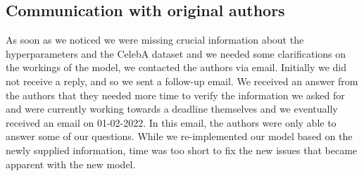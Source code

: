 \subsection{Communication with original authors}

As soon as we noticed we were missing crucial information about the hyperparameters and the CelebA dataset and we needed some clarifications on the workings of the model, we contacted the authors via email. Initially we did not receive a reply, and so we sent a follow-up email. We received an answer from the authors that they needed more time to verify the information we asked for and were currently working towards a deadline themselves and we eventually received an email on 01-02-2022. In this email, the authors were only able to answer some of our questions. While we re-implemented our model based on the newly supplied information, time was too short to fix the new issues that became apparent with the new model.
